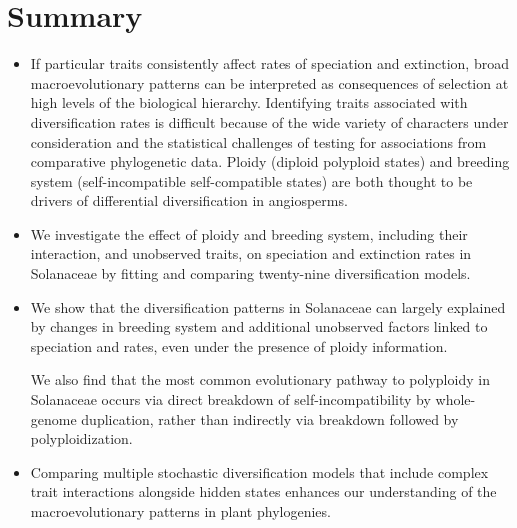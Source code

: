 \section{Summary}

\begin{itemize}
\item If particular traits consistently affect rates of speciation and extinction, broad macroevolutionary patterns can be interpreted as consequences of selection at high levels of the biological hierarchy.
Identifying traits associated with diversification rates is difficult because of the wide variety of characters under consideration and the statistical challenges of testing for associations from comparative phylogenetic data.
Ploidy (diploid \vs polyploid states) and breeding system (self-incompatible \vs self-compatible states) are both thought to be drivers of differential diversification in angiosperms. %

\item  We investigate the effect of ploidy and breeding system, including their interaction, and unobserved traits, on speciation and extinction rates in Solanaceae by fitting and comparing twenty-nine diversification models. %

\item We show that the diversification patterns in Solanaceae can largely explained by changes in breeding system and additional unobserved factors linked to speciation and rates, even under the presence of ploidy information. %

We also find that the most common evolutionary pathway to polyploidy in Solanaceae occurs via direct breakdown of self-incompatibility by whole-genome duplication, rather than indirectly via breakdown followed by polyploidization.

\item Comparing multiple stochastic diversification models that include complex trait interactions alongside hidden states enhances our understanding of the macroevolutionary patterns in plant phylogenies.  %
\end{itemize}